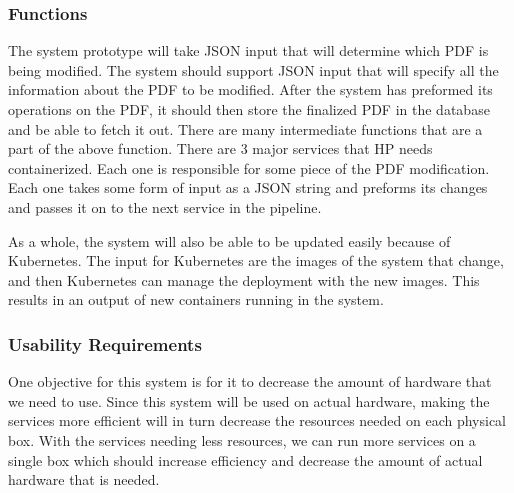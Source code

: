\documentclass[onecolumn, draftclsnofoot,10pt, compsoc]{IEEEtran}
\begin{document}
\subsubsection{Functions}

The system prototype will take JSON input that will determine which PDF is being modified.
The system should support JSON input that will specify all the information about the PDF to be modified.
After the system has preformed its operations on the PDF, it should then store the finalized PDF in the database and be able to fetch it out. 
There are many intermediate functions that are a part of the above function.
There are 3 major services that HP needs containerized.
Each one is responsible for some piece of the PDF modification.
Each one takes some form of input as a JSON string and preforms its changes and passes it on to the next service in the pipeline.

As a whole, the system will also be able to be updated easily because of Kubernetes.
The input for Kubernetes are the images of the system that change, and then Kubernetes can manage the deployment with the new images.
This results in an output of new containers running in the system. 



\subsubsection{Usability Requirements}

One objective for this system is for it to decrease the amount of hardware that we need to use.
Since this system will be used on actual hardware, making the services more efficient will in turn decrease the resources needed on each physical box.
With the services needing less resources, we can run more services on a single box which should increase efficiency and decrease the amount of actual hardware that is needed. 
\end{document}
